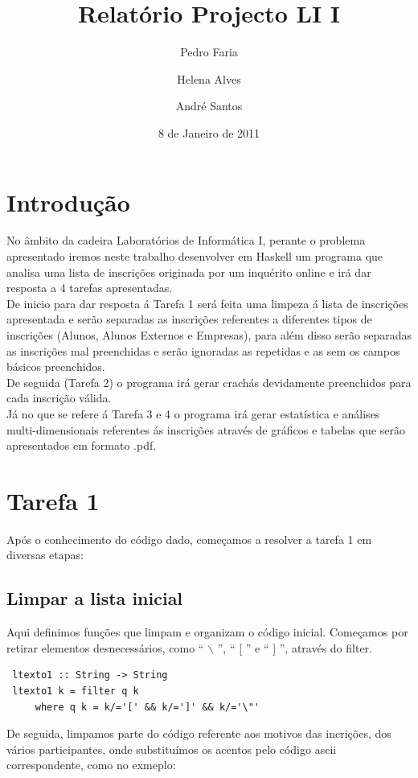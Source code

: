 \documentclass[a4paper,10pt]{article}
\title{Relatório Projecto LI I}
\author{Pedro Faria \and Helena Alves \and André Santos}
\date{8 de Janeiro de 2011}
\begin{document}
\maketitle
\tableofcontents

\section{Introdução}

No âmbito da cadeira Laboratórios de Informática I, perante o problema apresentado iremos neste trabalho desenvolver em Haskell um programa que analisa uma lista de inscrições originada por um inquérito online e irá dar resposta a 4 tarefas apresentadas. 
\\De inicio para dar resposta á Tarefa 1 será feita uma limpeza á lista de inscrições apresentada e serão separadas as inscrições referentes a diferentes tipos de inscrições (Alunos, Alunos Externos e Empresas), para além disso serão separadas as inscrições mal preenchidas e serão ignoradas as repetidas e as sem os campos básicos preenchidos.
\\De seguida (Tarefa 2) o programa irá gerar crachás devidamente preenchidos para cada inscrição válida.
\\Já no que se refere á Tarefa 3 e 4 o programa irá gerar estatística e análises multi-dimensionais referentes ás inscrições através de gráficos e tabelas que serão apresentados em formato .pdf.


\newpage
\section{Tarefa 1}
      Após o conhecimento do código dado, começamos a resolver a tarefa 1 em diversas etapas:


\subsection{Limpar a lista inicial} 

      Aqui definimos funções que limpam e organizam o código inicial. Começamos por retirar elementos desnecessários, como `` $\backslash$ '', `` [ '' e `` ] '', através do filter.
\begin{verbatim}
 ltexto1 :: String -> String
 ltexto1 k = filter q k
	 where q k = k/='[' && k/=']' && k/='\"'
\end{verbatim} 

     De seguida, limpamos parte do código referente aos motivos das incrições, dos vários participantes, onde substituímos os acentos pelo código ascii correspondente, como no exmeplo:
\end{document}
